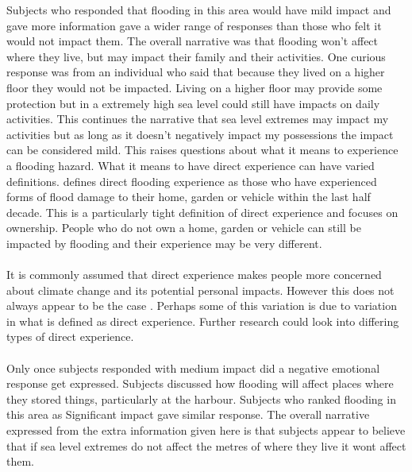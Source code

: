 Subjects who responded that flooding in this area would have mild impact and gave more information gave a wider range of responses than those who felt it would not impact them. The overall narrative was that flooding won’t affect where they live, but may impact their family and their activities. One curious response was from an individual who said that because they lived on a higher floor they would not be impacted. Living on a higher floor may provide some protection but in a extremely high sea level could still have impacts on daily activities. This continues the narrative that sea level extremes may impact my activities but as long as it doesn't negatively impact my possessions the impact can be considered mild. This raises questions about what it means to experience a flooding hazard. What it means to have direct experience can have varied definitions. 
\cite{whitmarsh_are_2008} defines direct flooding experience as those who have experienced forms of flood damage to their home, garden or vehicle within the last half decade. This is a particularly tight definition of direct experience and focuses on ownership. People who do not own a home, garden or vehicle can still be impacted by flooding and their experience may be very different.  
\paragraph{}
It is commonly assumed that direct experience makes people more concerned about climate change and its potential personal impacts\cite{lujala_role_2020}. However this does not always appear to be the case \cite{lujala_role_2020}. Perhaps some of this variation is due to variation in what is defined as direct experience. Further research could look into differing types of direct experience. 
\paragraph{}
Only once subjects responded with medium impact did a negative emotional response get expressed. Subjects discussed how flooding will affect places where they stored things, particularly at the harbour. Subjects who ranked flooding in this area as Significant impact gave similar response. The overall narrative expressed from the extra information given here is that subjects appear to believe that if sea level extremes do not affect the metres of where they live it wont affect them. 
